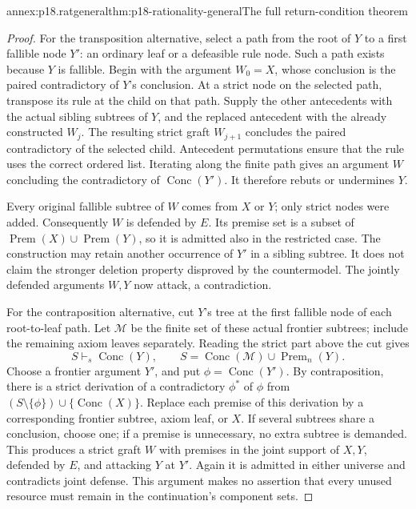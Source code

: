 \begin{annexitem}{annex:p18.ratgeneral}{thm:p18-rationality-general}{The full return-condition theorem}
\begin{proof}
For the transposition alternative, select a path from the root of \(Y\)
to a first fallible node \(Y'\): an ordinary leaf or a defeasible
rule node. Such a path exists because \(Y\) is fallible.
Begin with the argument \(W_0=X\), whose conclusion is the paired
contradictory of \(Y\)'s conclusion. At a strict node on the selected
path, transpose its rule at the child on that path.
Supply the other antecedents with the actual sibling subtrees of \(Y\),
and the replaced antecedent with the already constructed \(W_j\).
The resulting strict graft \(W_{j+1}\) concludes the paired contradictory
of the selected child. Antecedent permutations ensure that the rule
uses the correct ordered list. Iterating along the finite path gives
an argument \(W\) concluding the contradictory of
\(\operatorname{Conc}(Y')\). It therefore rebuts or undermines \(Y\).

Every original fallible subtree of \(W\) comes from \(X\) or \(Y\);
only strict nodes were added. Consequently \(W\) is defended by \(E\).
Its premise set is a subset of
\(\operatorname{Prem}(X)\cup\operatorname{Prem}(Y)\), so it is
admitted also in the restricted case. The construction may retain
another occurrence of \(Y'\) in a sibling subtree. It does not claim
the stronger deletion property disproved by the countermodel.
The jointly defended arguments \(W,Y\) now attack, a contradiction.

For the contraposition alternative, cut \(Y\)'s tree at the first
fallible node of each root-to-leaf path. Let \(\mathcal M\) be the
finite set of these actual frontier subtrees; include the remaining
axiom leaves separately. Reading the strict part above the cut gives
\[
 S\vdash_s\operatorname{Conc}(Y),\qquad
 S=\operatorname{Conc}(\mathcal M)\cup\operatorname{Prem}_n(Y).
 \tag{3}
\]
Choose a frontier argument \(Y'\), and put
\(\phi=\operatorname{Conc}(Y')\).
By contraposition, there is a strict derivation of a contradictory
\(\phi^\ast\) of \(\phi\) from
\((S\setminus\{\phi\})\cup\{\operatorname{Conc}(X)\}\).
Replace each premise of this derivation by a corresponding frontier
subtree, axiom leaf, or \(X\). If several subtrees share a conclusion,
choose one; if a premise is unnecessary, no extra subtree is demanded.
This produces a strict graft \(W\) with premises in the joint support
of \(X,Y\), defended by \(E\), and attacking \(Y\) at \(Y'\).
Again it is admitted in either universe and contradicts joint defense.
This argument makes no assertion that every unused resource must remain
in the continuation's component sets.


\end{proof}
\end{annexitem}
